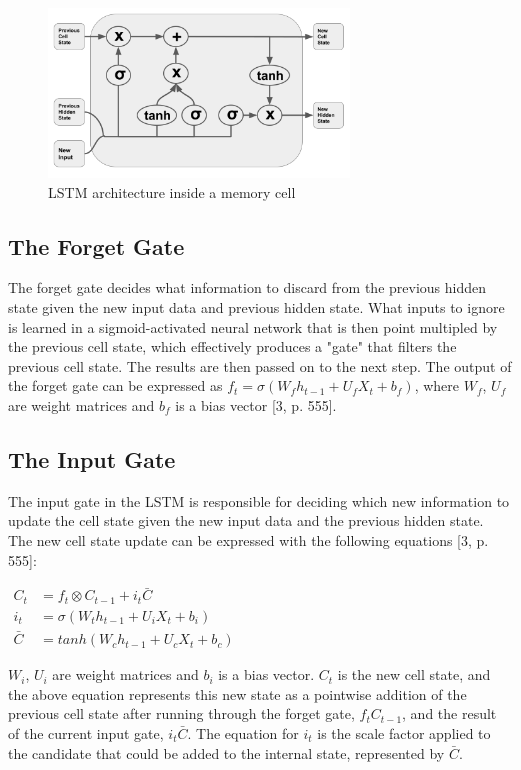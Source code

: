 \documentclass[journal]{IEEEtran}
\begin{document}
\begin{figure}[h]
  \centering
  \includegraphics[width=8cm]{jordan_lstm_architecture.png}
  \caption{LSTM architecture inside a memory cell}
\end{figure}

\subsection{The Forget Gate}
The forget gate decides what information to discard from the previous hidden state given
the new input data and previous hidden state. What inputs to ignore is learned in a sigmoid-activated
neural network that is then point multipled by the previous cell state, which effectively produces a "gate" that
filters the previous cell state. The results are then passed on to the next step. The output of the forget gate
can be expressed as $f_{t} = \sigma(W_{f}h_{t-1} + U_{f}X_{t} + b_{f})$,
where $W_{f}$, $U_{f}$ are weight matrices and $b_{f}$ is a bias vector [3, p. 555].

\subsection{The Input Gate}
The input gate in the LSTM is responsible for deciding which new
information to update the cell state given the new input data and the previous hidden state.
The new cell state update can be expressed with the following equations [3, p. 555]:

$\begin{array}{ll}
C_{t}   & = f_{t} \otimes C_{t-1} + i_{t}\bar{C} \\
i_{t}   & = \sigma(W_{t}h_{t-1} + U_{i}X_{t} + b_{i}) \\
\bar{C} & = tanh(W_{c}h_{t-1} + U_{c}X_{t} + b_{c})
\end{array}$

$W_{i}$, $U_{i}$ are weight matrices and $b_{i}$ is a bias vector. $C_{t}$ is the new cell state, and the above equation
represents this new state as a pointwise addition of the previous cell state after
running through the forget gate, $f_{t}C_{t-1}$, and the result of the current input gate, $i_{t}\bar{C}$.
The equation for $i_{t}$ is the scale factor applied to the candidate that could be added to the
internal state, represented by $\bar{C}$.
\end{document}
